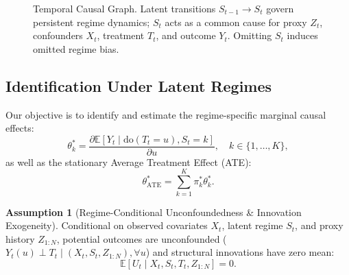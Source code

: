 \documentclass[twoside]{article}
\theoremstyle{definition}
\newtheorem{assumption}{Assumption}
\newcommand{\E}{\mathbb{E}}
\begin{document}
\begin{figure}[t]
\centering
{}
\caption{Temporal Causal Graph. Latent transitions $S_{t-1} \to S_t$ govern persistent regime dynamics; $S_t$ acts as a common cause for proxy $Z_t$, confounders $X_t$, treatment $T_t$, and outcome $Y_t$. Omitting $S_t$ induces omitted regime bias.}
\label{fig:dag}
\end{figure}

\subsection{Identification Under Latent Regimes}
Our objective is to identify and estimate the regime-specific marginal causal effects:
\begin{equation}
    \theta_k^* = \frac{\partial \E[Y_t \mid \text{do}(T_t = u), S_t = k]}{\partial u}, \quad k \in \{1, \dots, K\},
\end{equation}
as well as the stationary Average Treatment Effect (ATE):
\begin{equation}
    \theta_{\text{ATE}}^* = \sum_{k=1}^K \pi_k^* \theta_k^*.
\end{equation}

\begin{assumption}[Regime-Conditional Unconfoundedness \& Innovation Exogeneity]
\label{ass:unconfoundedness}
Conditional on observed covariates $X_t$, latent regime $S_t$, and proxy history $Z_{1:N}$, potential outcomes are unconfounded ($Y_t(u) \perp T_t \mid (X_t, S_t, Z_{1:N}), \forall u$) and structural innovations have zero mean:
\begin{equation}
    \E[U_t \mid X_t, S_t, T_t, Z_{1:N}] = 0.
\end{equation}
\end{assumption}
\end{document}
